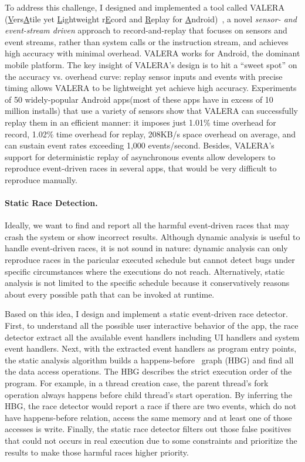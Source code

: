 \documentclass[12pt]{article}
\newcommand{\mypara}[1]{\paragraph*{#1.}}
\newcommand{\valera}{\mbox{{\small \sf VALERA}}\xspace}
\begin{document}
To address this challenge, I designed and implemented a tool called \valera
(\underline{V}ers\underline{A}tile yet \underline{L}ightweight
r\underline{E}cord and \underline{R}eplay for \underline{A}ndroid)~\cite{oopsla15hu},
a novel \emph{sensor- and event-stream driven} approach to record-and-replay that
focuses on sensors and event streams, rather than system calls or the instruction stream,
and achieves high accuracy with minimal overhead. \valera works for Android, the dominant
mobile platform. The key insight of \valera's design is to hit a ``sweet spot'' on the
accuracy vs. overhead curve: replay sensor inputs and events with precise timing allows
\valera to be lightweight yet achieve high accuracy. Experiments of 50 widely-popular
Android apps(most of these apps have in excess of 10 million installs) that use a variety
of sensors show that \valera can successfully replay them in an efficient manner: it
imposes just 1.01\% time overhead for record, 1.02\% time overhead for replay, 208KB/s
space overhead on average, and can sustain event rates exceeding 1,000 events/second.
Besides, \valera's support for deterministic replay of asynchronous events allow developers
to reproduce event-driven races in several apps, that would be very difficult to reproduce
manually.



\mypara{Static Race Detection}
Ideally, we want to find and report all the harmful event-driven races that may crash
the system or show incorrect results. Although dynamic analysis is useful to handle
event-driven races, it is not sound in nature: dynamic analysis can only reproduce races
in the paricular executed schedule but cannot detect bugs under specific circumstances
where the executions do not reach. Alternatively, static analysis is not limited to the
specific schedule because it conservatively reasons about every possible path that can be
invoked at runtime.

Based on this idea, I design and implement a static event-driven race detector.
First, to understand all the possible user interactive behavior of the app, the
race detector extract all the available event handlers including UI handlers and
system event handlers. Next, with the extracted event handlers as program entry points,
the static analysis algorithm builds a happens-before~\cite{Lamport} graph (HBG) and find all the
data access operations. The HBG describes the strict execution order of the program.
For example, in a thread creation case, the parent thread's fork operation always
happens before child thread's start operation. By inferring the HBG, the race detector
would report a race if there are two events, which do not have happens-before relation,
access the same memory and at least one of those accesses is write. Finally, the
static race detector filters out those false positives that could not occurs in real
execution due to some constraints and prioritize the results to make those harmful
races higher priority.
\end{document}
